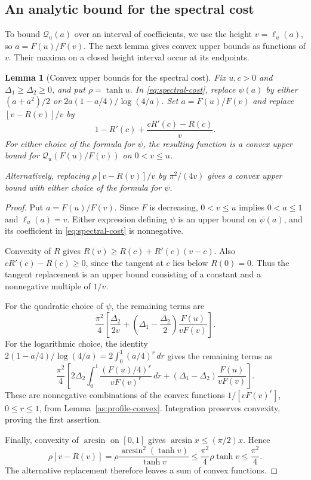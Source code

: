 \documentclass[11pt,letterpaper]{amsart}
\newcommand{\1}{\mathbf 1}
\newtheorem{lemma}[theorem]{Lemma}
\numberwithin{equation}{section}
\begin{document}
\subsection{An analytic bound for the spectral cost}

To bound $\mathcal Q_u(a)$ over an interval of coefficients,
we use the height $v=\ell_u(a)$, so $a=F(u)/F(v)$.
The next lemma gives convex upper bounds as functions of $v$.
Their maxima on a closed height interval occur at its endpoints.

\begin{lemma}[Convex upper bounds for the spectral cost]
\label{as:convex-majorant}
Fix $u,c>0$ and $\Delta_1\ge\Delta_2\ge0$, and put $\rho=\tanh u$.
In \eqref{eq:spectral-cost}, replace $\psi(a)$ by either
$(a+a^2)/2$ or $2a(1-a/4)/\log(4/a)$.
Set $a=F(u)/F(v)$ and replace $[v-R(v)]/v$ by
\[
 1-R'(c)+\frac{cR'(c)-R(c)}{v}.
\]
For either choice of the formula for $\psi$, the resulting
function is a convex upper bound for
$\mathcal Q_u(F(u)/F(v))$ on $0<v\le u$.

Alternatively, replacing $\rho[v-R(v)]/v$ by
$\pi^2/(4v)$ gives a convex upper bound with either choice
of the formula for $\psi$.
\end{lemma}

\begin{proof}
Put $a=F(u)/F(v)$.
Since $F$ is decreasing, $0<v\le u$ implies
$0<a\le1$ and $\ell_u(a)=v$.
Either expression defining $\psi$ is an upper bound on $\psi(a)$,
and its coefficient in \eqref{eq:spectral-cost} is nonnegative.

Convexity of $R$ gives
$R(v)\ge R(c)+R'(c)(v-c)$.
Also $cR'(c)-R(c)\ge0$, since the tangent at $c$ lies below
$R(0)=0$.
Thus the tangent replacement is an upper bound consisting
of a constant and a nonnegative multiple of $1/v$.

For the quadratic choice of $\psi$, the remaining terms are
\[
 \frac{\pi^2}{4}
 \left[
   \frac{\Delta_2}{2v}
   +\left(\Delta_1-\frac{\Delta_2}{2}\right)
      \frac{F(u)}{vF(v)}
 \right].
\]
For the logarithmic choice, the identity
$2(1-a/4)/\log(4/a)=2\int_0^1(a/4)^r\,dr$
gives the remaining terms as
\[
 \frac{\pi^2}{4}
 \left[
   2\Delta_2\int_0^1
      \frac{(F(u)/4)^r}{vF(v)^r}\,dr
   +(\Delta_1-\Delta_2)\frac{F(u)}{vF(v)}
 \right].
\]
These are nonnegative combinations of the convex functions
$1/[vF(v)^r]$, $0\le r\le1$, from
Lemma~\ref{as:profile-convex}.
Integration preserves convexity, proving the first assertion.

Finally, convexity of $\arcsin$ on $[0,1]$ gives
$\arcsin x\le(\pi/2)x$.
Hence
\[
 \rho[v-R(v)]
 =\rho\frac{\arcsin^2(\tanh v)}{\tanh v}
 \le\frac{\pi^2}{4}\rho\tanh v
 \le\frac{\pi^2}{4}.
\]
The alternative replacement therefore leaves a sum of convex
functions.
\end{proof}
\end{document}
